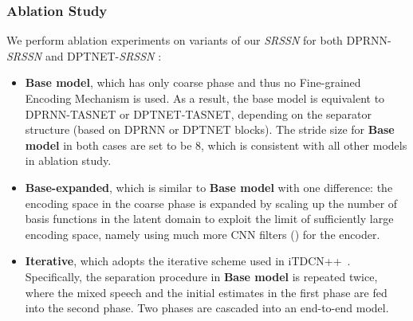 \subsubsection{Ablation Study}
\label{sssec:ablation}
We perform ablation experiments on  variants of our \emph{SRSSN} for both DPRNN-\emph{SRSSN} and DPTNET-\emph{SRSSN} :
\begin{itemize}\setlength{\itemsep}{-0cm}
    \item \textbf{Base model}, which has only coarse phase and thus no Fine-grained Encoding Mechanism is used. As a result, the base model is equivalent to DPRNN-TASNET or DPTNET-TASNET, depending on the separator structure (based on DPRNN or DPTNET blocks). The stride size for \textbf{Base model} in both cases are set to be 8, which is consistent with all other models in ablation study. \item \textbf{Base-expanded}, which is similar to \textbf{Base model} with one difference: the encoding space in the coarse phase is expanded by scaling up the number of basis functions in the latent domain to exploit the limit of sufficiently large encoding space, namely using much more CNN filters () for the encoder. 
    \item \textbf{Iterative}, which adopts the iterative scheme used in iTDCN++~\cite{universal, improving}. Specifically, the separation procedure in \textbf{Base model} is repeated twice, where the mixed speech and the initial estimates in the first phase are fed into the second phase. Two phases are cascaded into an end-to-end model.

\end{itemize}
